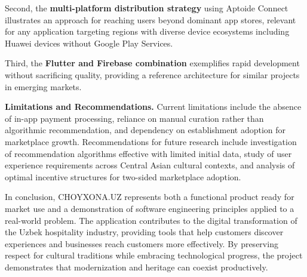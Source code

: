 Second, the \textbf{multi-platform distribution strategy} using Aptoide Connect illustrates an approach for reaching users beyond dominant app stores, relevant for any application targeting regions with diverse device ecosystems including Huawei devices without Google Play Services.

Third, the \textbf{Flutter and Firebase combination} exemplifies rapid development without sacrificing quality, providing a reference architecture for similar projects in emerging markets.

\vspace{4mm}
\textbf{Limitations and Recommendations.}
Current limitations include the absence of in-app payment processing, reliance on manual curation rather than algorithmic recommendation, and dependency on establishment adoption for marketplace growth.
Recommendations for future research include investigation of recommendation algorithms effective with limited initial data, study of user experience requirements across Central Asian cultural contexts, and analysis of optimal incentive structures for two-sided marketplace adoption.

\vspace{4mm}
In conclusion, CHOYXONA.UZ represents both a functional product ready for market use and a demonstration of software engineering principles applied to a real-world problem.
The application contributes to the digital transformation of the Uzbek hospitality industry, providing tools that help customers discover experiences and businesses reach customers more effectively.
By preserving respect for cultural traditions while embracing technological progress, the project demonstrates that modernization and heritage can coexist productively.
